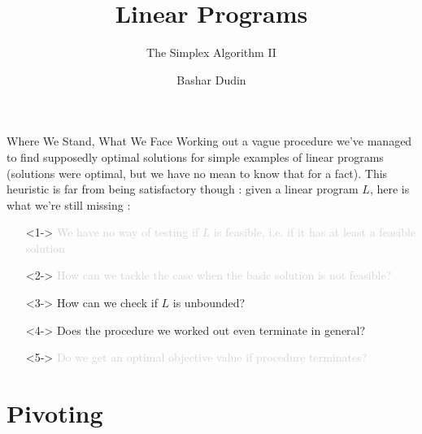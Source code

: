 \documentclass[aspectratio = 169]{beamer}
\author[BD]{Bashar Dudin}
\institute[]{EPITA}
\title{Linear Programs} %
\subtitle{The Simplex Algorithm II}
\begin{document}
\begin{frame}[plain]
\titlepage %
\end{frame}

\begin{frame}{Where We Stand, What We Face}
  Working out a vague procedure we've managed to find supposedly
  optimal solutions for simple examples of linear programs (solutions
  were optimal, but we have no mean to know that for a fact).  This
  heuristic is far from being satisfactory though : given a linear
  program $L$, here is what we're still missing :
    \begin{itemize}
        \item[\textcolor<6>{lightgray}{\textbullet}]<1->
          \textcolor<6>{lightgray}{We have no way of testing if $L$ is
            feasible, i.e. if it has at least a feasible solution}
        \item[\textcolor<6>{lightgray}{\textbullet}]<2->
          \textcolor<6>{lightgray}{How can we tackle the case when the
            basic solution is not feasible?}
        \item[\textbullet]<3->
          How can we check if $L$ is unbounded?
        \item[\textbullet]<4->
          Does the procedure we worked out even terminate in general?
        \item[\textcolor<6>{lightgray}{\textbullet}]<5->
          \textcolor<6>{lightgray}{Do we get an optimal objective
            value if procedure terminates?}
    \end{itemize}
\end{frame}

\section{Pivoting}
\end{document}
